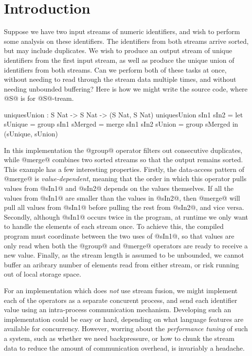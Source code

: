 \section{Introduction}
\label{s:Introduction}

Suppose we have two input streams of numeric identifiers, and wish to perform some analysis on these identifiers. The identifiers from both streams arrive sorted, but may include duplicates. We wish to produce an output stream of unique identifiers from the first input stream, as well as produce the unique union of identifiers from both streams. Can we perform both of these tasks at once, without needing to read through the stream data multiple times, and without needing unbounded buffering? Here is how we might write the source code, where @S@ is for @S@-tream.
\begin{code}
  uniquesUnion : S Nat -> S Nat -> (S Nat, S Nat)
  uniquesUnion sIn1 sIn2
   = let  sUnique = group sIn1
          sMerged = merge sIn1 sIn2
          sUnion  = group sMerged
     in   (sUnique, sUnion)
\end{code}

In this implementation the @group@ operator filters out consecutive duplicates, while @merge@ combines two sorted streams so that the output remains sorted. This example has a few interesting properties. Firstly, the data-access pattern of @merge@ is \emph{value-dependent}, meaning that the order in which this operator pulls values from @sIn1@ and @sIn2@ depends on the values themselves. If all the values from @sIn1@ are smaller than the values in @sIn2@, then @merge@ will pull all values from @sIn1@ before pulling the rest from @sIn2@, and vice versa. Secondly, although @sIn1@ occurs twice in the program, at runtime we only want to handle the elements of each stream once. To achieve this, the compiled program must coordinate between the two uses of @sIn1@, so that values are only read when both the @group@ and @merge@ operators are ready to receive a new value. Finally, as the stream length is assumed to be unbounded, we cannot buffer an aribrary number of elements read from either stream, or risk running out of local storage space.

For an implementation which does \emph{not} use stream fusion, we might implement each of the operators as a separate concurent process, and send each identifier value using an intra-process communication mechanism. Developing such an implementation could be easy or hard, depending on what language features are available for concurrency. However, worring about the \emph{performance tuning} of such a system, such as whether we need backpressure, or how to chunk the stream data to reduce the amount of communication overhead, is invariably a headache. 

